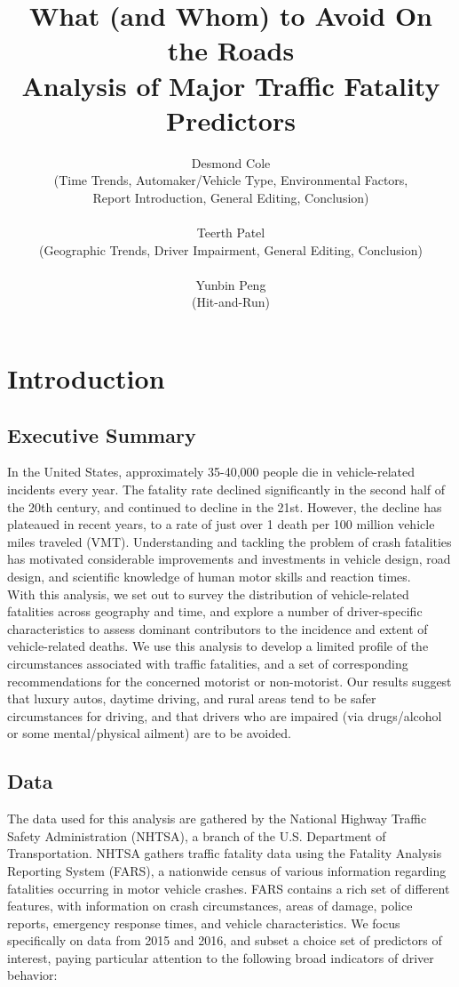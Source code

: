 \documentclass[11pt, oneside,titlepage]{article}   	%
\title{\textbf{What (and Whom) to Avoid On the Roads \\ 
\large Analysis of Major Traffic Fatality Predictors}}
\author{Desmond Cole \\
(Time Trends, Automaker/Vehicle Type, Environmental Factors, \\
Report Introduction, General Editing, Conclusion) \\
\\
Teerth Patel \\
(Geographic Trends, Driver Impairment,
General Editing, Conclusion) \\
\\
Yunbin Peng \\
(Hit-and-Run)}
\begin{document}
\maketitle
\section*{Introduction}
\subsection*{Executive Summary}
In the United States, approximately 35-40,000 people die in vehicle-related incidents every year. The fatality rate declined significantly in the second half of the 20th century, and continued to decline in the 21st. However, the decline has plateaued in recent years, to a rate of just over 1 death per 100 million vehicle miles traveled (VMT). Understanding and tackling the problem of crash fatalities has motivated considerable improvements and investments in vehicle design, road design, and scientific knowledge of human motor skills and reaction times. \\ 

With this analysis, we set out to survey the distribution of vehicle-related fatalities across geography and time, and explore a number of driver-specific characteristics to assess dominant contributors to the incidence and extent of vehicle-related deaths. We use this analysis to develop a limited profile of the circumstances associated with traffic fatalities, and a set of corresponding recommendations for the concerned motorist or non-motorist. Our results suggest that luxury autos, daytime driving, and rural areas tend to be safer circumstances for driving, and that drivers who are impaired (via drugs/alcohol or some mental/physical ailment) are to be avoided.  

\subsection*{Data}
The data used for this analysis are gathered by the National Highway Traffic Safety Administration (NHTSA), a branch of the U.S. Department of Transportation. NHTSA gathers traffic fatality data using the Fatality Analysis Reporting System (FARS), a nationwide census of various information regarding fatalities occurring in motor vehicle crashes. FARS contains a rich set of different features, with information on crash circumstances, areas of damage, police reports, emergency response times, and vehicle characteristics. We focus specifically on data from 2015 and 2016, and subset a choice set of predictors of interest, paying particular attention to the following broad indicators of driver behavior:
\end{document}
